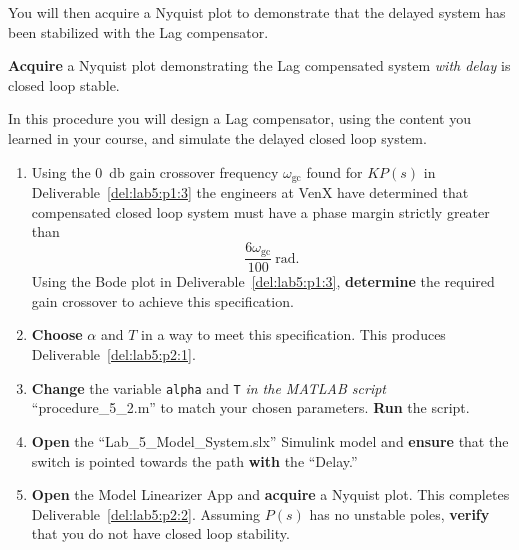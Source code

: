 %
You will then acquire a Nyquist plot to demonstrate that the delayed system has been stabilized with the Lag compensator.
%
\begin{deliverable}[label={del:lab5:p2:2}]
  \textbf{Acquire} a Nyquist plot demonstrating the Lag compensated system \emph{with delay} is closed loop stable.
\end{deliverable}
%
\begin{procedure}[label={proc:lab5:2}]
  In this procedure you will design a Lag compensator, using the content you learned in your course, and simulate the delayed closed loop system.
  \begin{enumerate}[label={(\arabic*)}]
    \item{%
      Using the \SI{0}{\decibel} gain crossover frequency \(\omega_\mathrm{gc}\) found for \(K P(s)\) in Deliverable~\ref{del:lab5:p1:3} the engineers at VenX have determined that compensated closed loop system must have a phase margin strictly greater than
      \[
        \frac{6\omega_\mathrm{gc}}{100}~\mathrm{rad}.
      \]
      Using the Bode plot in Deliverable~\ref{del:lab5:p1:3}, \textbf{determine} the required gain crossover to achieve this specification.
    }
    \item{%
      \textbf{Choose} \(\alpha\) and \(T\) in a way to meet this specification.
      This produces Deliverable~\ref{del:lab5:p2:1}.
    }
    \item{%
      \textbf{Change} the variable \texttt{alpha} and \texttt{T} \emph{in the MATLAB script} ``procedure\_5\_2.m'' to match your chosen parameters.
      \textbf{Run} the script.
    }
    \item{%
      \textbf{Open} the ``Lab\_5\_Model\_System.slx'' Simulink model and \textbf{ensure} that the switch is pointed towards the path \textbf{with} the ``Delay.''
    }
    \item{%
      \textbf{Open} the Model Linearizer App and \textbf{acquire} a Nyquist plot.
      This completes Deliverable~\ref{del:lab5:p2:2}.
      Assuming \(P(s)\) has no unstable poles, \textbf{verify} that you do not have closed loop stability.
    }
  \end{enumerate}
\end{procedure}

